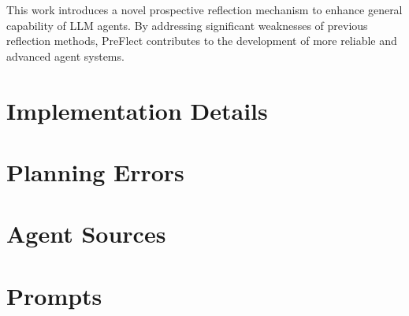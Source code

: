 \documentclass{article}
\theoremstyle{plain}
\theoremstyle{definition}
\theoremstyle{remark}
\newcommand{\method}{PreFlect\xspace}
\begin{document}

This work introduces a novel prospective reflection mechanism to enhance general capability of LLM agents. By addressing significant weaknesses of previous reflection methods, \method contributes to the development of more reliable and advanced agent systems.





\newpage
\appendix
\onecolumn


\section{Implementation Details}
\label{appendix:imp}




% 


\section{Planning Errors}
\label{appendix:error}




\section{Agent Sources}
\label{appendix:source}




\section{Prompts}
\label{appendix:prompt}

\end{document}
